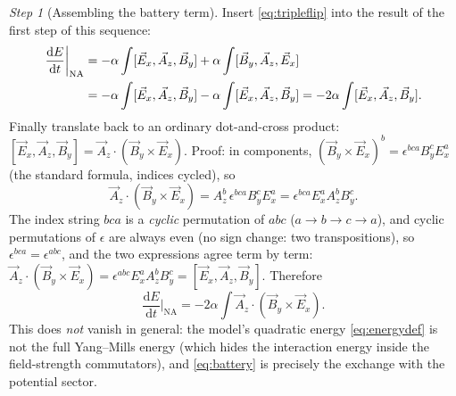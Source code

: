 \documentclass[11pt,a4paper]{article}
\numberwithin{equation}{section}
\theoremstyle{remark}
\newtheorem{step}{Step}[subsection]
\newcommand{\dd}{\mathrm{d}}
\begin{document}
\begin{step}[Assembling the battery term]
Insert \eqref{eq:tripleflip} into the result of the first step of this
sequence:
\begin{align}
\frac{\dd E}{\dd t}\bigg|_{\mathrm{NA}}
&=-\alpha\int[\vec E_x,\vec A_z,\vec B_y]
+\alpha\int[\vec B_y,\vec A_z,\vec E_x]\notag\\
&=-\alpha\int[\vec E_x,\vec A_z,\vec B_y]-\alpha\int[\vec E_x,\vec A_z,\vec B_y]
=-2\alpha\int[\vec E_x,\vec A_z,\vec B_y] .
\end{align}
Finally translate back to an ordinary dot-and-cross product:
$[\vec E_x,\vec A_z,\vec B_y]=\vec A_z\cdot(\vec B_y\times\vec E_x)$. Proof:
in components, $(\vec B_y\times\vec E_x)^b=\epsilon^{bca}B_y^cE_x^a$ (the
standard formula, indices cycled), so
\begin{equation}
\vec A_z\cdot(\vec B_y\times\vec E_x)
=A_z^b\,\epsilon^{bca}B_y^cE_x^a
=\epsilon^{bca}E_x^aA_z^bB_y^c .
\end{equation}
The index string $bca$ is a \emph{cyclic} permutation of $abc$
($a\to b\to c\to a$), and cyclic permutations of $\epsilon$ are always even
(no sign change: two transpositions), so $\epsilon^{bca}=\epsilon^{abc}$,
and the two expressions agree term by term:
$\vec A_z\cdot(\vec B_y\times\vec E_x)=\epsilon^{abc}E_x^aA_z^bB_y^c
=[\vec E_x,\vec A_z,\vec B_y]$. Therefore
\begin{equation}
\frac{\dd E}{\dd t}\bigg|_{\mathrm{NA}}
=-2\alpha\int \vec A_z\cdot(\vec B_y\times\vec E_x).
\label{eq:battery}
\end{equation}
This does \emph{not} vanish in general: the model's quadratic energy
\eqref{eq:energydef} is not the full Yang--Mills energy (which hides the
interaction energy inside the field-strength commutators), and
\eqref{eq:battery} is precisely the exchange with the potential sector.
\end{step}
\end{document}
